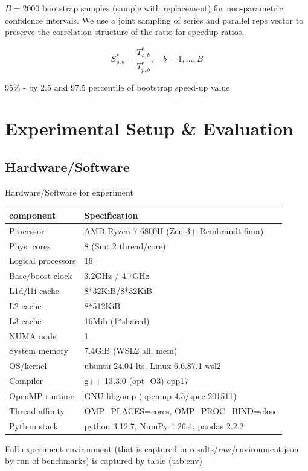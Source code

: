 \documentclass[conference]{IEEEtran}
\begin{document}
$B = 2000$ bootstrap samples (sample with replacement) for non-parametric confidence intervals. We use a joint sampling of series and parallel reps vector to preserve the correlation structure of the ratio for speedup ratios.

\[
S_{p,b}^{*} = \frac{T_{s,b}^{*}}{T_{p,b}^{*}}, \quad b = 1, \ldots, B
\]

95\% - by 2.5 and 97.5 percentile of bootstrap speed-up value

\section{Experimental Setup \& Evaluation}

\subsection{Hardware/Software}

Hardware/Software for experiment

\begin{table}[htbp]
\centering
\begin{tabular}{ll}
\hline
\textbf{component} & \textbf{Specification} \\
\hline
Processor & AMD Ryzen 7 6800H (Zen 3+ Rembrandt 6nm) \\
Phys. cores & 8 (Smt 2 thread/core) \\
Logical processors & 16 \\
Base/boost clock & 3.2GHz / 4.7GHz \\
L1d/l1i cache & 8*32KiB/8*32KiB \\
L2 cache & 8*512KiB \\
L3 cache & 16Mib (1*shared) \\
NUMA node & 1 \\
System memory & 7.4GiB (WSL2 all. mem) \\
OS/kernel & ubuntu 24.04 lts. Linux 6.6.87.1-wsl2 \\
Compiler & g++ 13.3.0 (opt -O3) cpp17 \\
OpenMP runtime & GNU libgomp (openmp 4.5/spec 201511) \\
Thread affinity & OMP\_PLACES=cores, OMP\_PROC\_BIND=close \\
Python stack & python 3.12.7, NumPy 1.26.4, pandas 2.2.2 \\
\hline
\end{tabular}
\end{table}

Full experiment environment (that is captured in results/raw/environment.json by run of benchmarks) is captured by table (tab:env)
\end{document}
